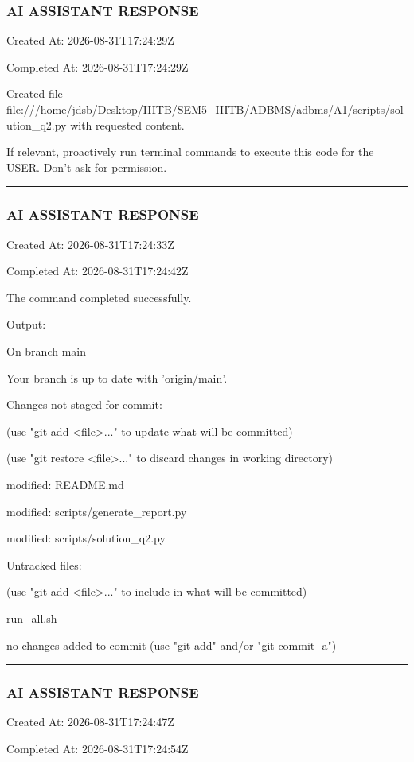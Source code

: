 \documentclass[11pt,a4paper]{article}
\begin{document}
\subsubsection{AI ASSISTANT RESPONSE}

Created At: 2026-08-31T17:24:29Z

Completed At: 2026-08-31T17:24:29Z

Created file file:///home/jdsb/Desktop/IIITB/SEM5\_IIITB/ADBMS/adbms/A1/scripts/solution\_q2.py with requested content.

If relevant, proactively run terminal commands to execute this code for the USER. Don't ask for permission.


\hrule

\subsubsection{AI ASSISTANT RESPONSE}

Created At: 2026-08-31T17:24:33Z

Completed At: 2026-08-31T17:24:42Z


The command completed successfully.

Output:

On branch main

Your branch is up to date with 'origin/main'.


Changes not staged for commit:

(use "git add <file>..." to update what will be committed)

(use "git restore <file>..." to discard changes in working directory)

modified:   README.md

modified:   scripts/generate\_report.py

modified:   scripts/solution\_q2.py


Untracked files:

(use "git add <file>..." to include in what will be committed)

run\_all.sh


no changes added to commit (use "git add" and/or "git commit -a")


\hrule

\subsubsection{AI ASSISTANT RESPONSE}

Created At: 2026-08-31T17:24:47Z

Completed At: 2026-08-31T17:24:54Z
\end{document}
